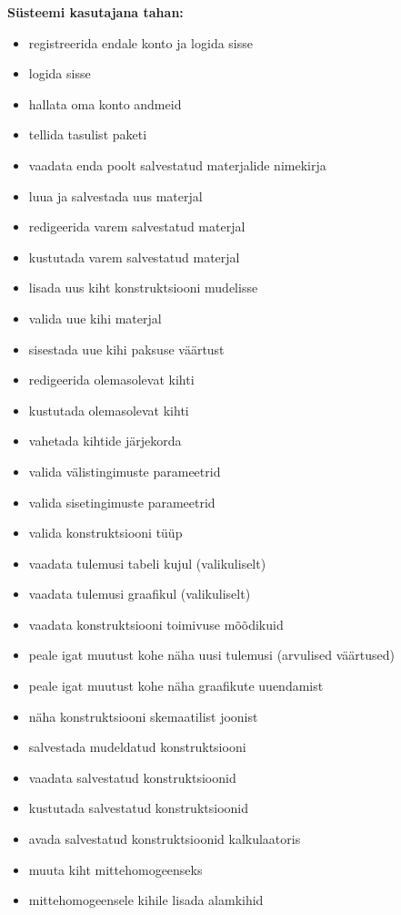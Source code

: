 \textbf{Süsteemi kasutajana tahan:}
\begin{itemize}
    \item registreerida endale konto ja logida sisse
    \item logida sisse
    \item hallata oma konto andmeid
    \item tellida tasulist paketi
    \item vaadata enda poolt salvestatud materjalide nimekirja
    \item luua ja salvestada uus materjal
    \item redigeerida varem salvestatud materjal
    \item kustutada varem salvestatud materjal
    \item lisada uus kiht konstruktsiooni mudelisse
    \item valida uue kihi materjal
    \item sisestada uue kihi paksuse väärtust
    \item redigeerida olemasolevat kihti
    \item kustutada olemasolevat kihti
    \item vahetada kihtide järjekorda
    \item valida välistingimuste parameetrid
    \item valida sisetingimuste parameetrid
    \item valida konstruktsiooni tüüp
    \item vaadata tulemusi tabeli kujul (valikuliselt)
    \item vaadata tulemusi graafikul (valikuliselt)
    \item vaadata konstruktsiooni toimivuse mõõdikuid
    \item peale igat muutust kohe näha uusi tulemusi (arvulised väärtused)
    \item peale igat muutust kohe näha graafikute uuendamist
    \item näha konstruktsiooni skemaatilist joonist
    \item salvestada mudeldatud konstruktsiooni
    \item vaadata salvestatud konstruktsioonid
    \item kustutada salvestatud konstruktsioonid
    \item avada salvestatud konstruktsioonid kalkulaatoris
    \item muuta kiht mittehomogeenseks
    \item mittehomogeensele kihile lisada alamkihid

\end{itemize}
